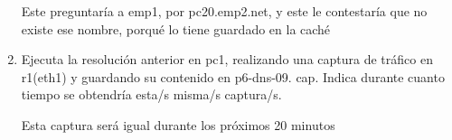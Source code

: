 \documentclass[12pt, a4paper]{report}
\begin{document}
\begin{enumerate}
  Este preguntaría a emp1, por pc20.emp2.net, y este le contestaría que no existe ese nombre, porqué lo tiene guardado en la caché

  \item Ejecuta la resolución anterior en pc1, realizando una captura de tráfico en r1(eth1) y guardando su contenido en p6-dns-09. cap. Indica durante cuanto tiempo se obtendría esta/s misma/s captura/s.
  
  Esta captura será igual durante los próximos 20 minutos

\end{enumerate}
\end{document}
